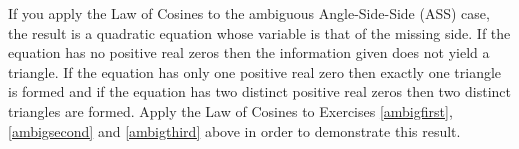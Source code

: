 { If you apply the Law of Cosines to the ambiguous Angle-Side-Side (ASS) case, the result is a quadratic equation whose variable is that of the missing side. If the equation has no positive real zeros then the information given does not yield a triangle.  If the equation has only one positive real zero then exactly one triangle is formed and if the equation has two distinct positive real zeros then two distinct triangles are formed.  Apply the Law of Cosines to Exercises \ref{ambigfirst}, \ref{ambigsecond} and \ref{ambigthird} above in order to demonstrate this result.  }
{}
